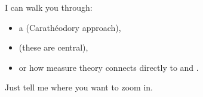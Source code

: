 \documentclass[12pt,a4paper]{report}
\begin{document}

I can walk you through:

		\begin{itemize}
        \item a  (Carathéodory approach),
        \item {} (these are central),
        \item or how measure theory connects directly to  and .
		\end{itemize}

Just tell me where you want to zoom in.
\end{document}
